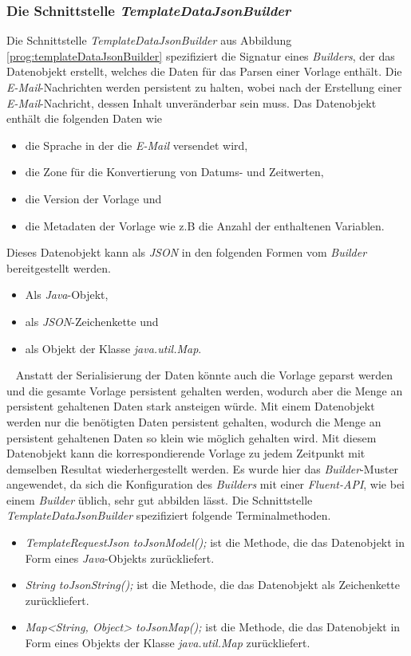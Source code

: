 \subsubsection{Die Schnittstelle \emph{TemplateDataJsonBuilder}}
\label{sec:templateDataJsonBuilder}
Die Schnittstelle \emph{TemplateDataJsonBuilder} aus Abbildung \ref{prog:templateDataJsonBuilder} spezifiziert die Signatur eines \emph{Builders}, der das Datenobjekt erstellt, welches die Daten für das Parsen einer Vorlage enthält. Die \emph{E-Mail}-Nachrichten werden persistent zu halten, wobei nach der Erstellung einer \emph{E-Mail}-Nachricht, dessen Inhalt unveränderbar sein muss. Das Datenobjekt enthält die folgenden Daten wie
\begin{itemize}
	\item die Sprache in der die \emph{E-Mail} versendet wird,
	\item die Zone für die Konvertierung von Datums- und Zeitwerten,
	\item die Version der Vorlage und 
	\item die Metadaten der Vorlage wie z.B die Anzahl der enthaltenen Variablen.
\end{itemize} 
Dieses Datenobjekt kann als \emph{JSON} in den folgenden Formen vom \emph{Builder} bereitgestellt werden.
\begin{itemize}
	\item Als \emph{Java}-Objekt,
	\item als \emph{JSON}-Zeichenkette und
	\item als Objekt der Klasse \emph{java.util.Map}.
\end{itemize}
\ \newline
Anstatt der Serialisierung der Daten könnte auch die Vorlage geparst werden und die gesamte Vorlage persistent gehalten werden, wodurch aber die Menge an persistent gehaltenen Daten stark ansteigen würde. Mit einem Datenobjekt werden nur die benötigten Daten persistent gehalten, wodurch die Menge an persistent gehaltenen Daten so klein wie möglich gehalten wird. Mit diesem Datenobjekt kann die korrespondierende Vorlage zu jedem Zeitpunkt mit demselben Resultat wiederhergestellt werden.
\newline
\newline
Es wurde hier das \emph{Builder}-Muster angewendet, da sich die Konfiguration des \emph{Builders} mit einer \emph{Fluent-API}, wie bei einem \emph{Builder} üblich, sehr gut abbilden lässt. Die Schnittstelle \emph{TemplateDataJsonBuilder} spezifiziert folgende Terminalmethoden.
\begin{itemize}
	\item\emph{TemplateRequestJson toJsonModel();}
	\newline
	ist die Methode, die das Datenobjekt in Form eines \emph{Java}-Objekts zurückliefert.
	\item\emph{String toJsonString();}
	\newline
	ist die Methode, die das Datenobjekt als Zeichenkette zurückliefert.
	\item\emph{Map<String, Object> toJsonMap();}
	\newline
	ist die Methode, die das Datenobjekt in Form eines Objekts der Klasse \emph{java.util.Map} zurückliefert.
\end{itemize} 
